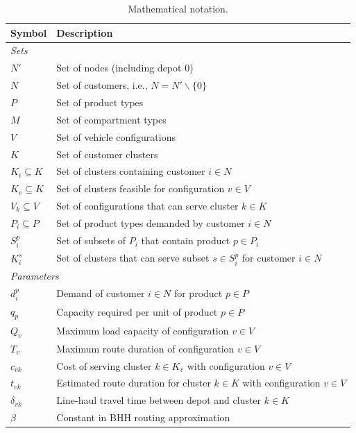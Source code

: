 \documentclass[11pt]{elsarticle}
\theoremstyle{plain}
\begin{document}
\begin{table}[htbp]
\centering
\caption{Mathematical notation.}
\label{tab:notation}
\begin{tabular}{ll}
    \toprule
    Symbol &  Description \\
    \midrule
    \multicolumn{2}{l}{\textit{Sets}} \\
    \midrule
    $N'$ & Set of nodes (including depot $0$) \\
    $N$ & Set of customers, i.e., $N = N' \backslash \{0\}$ \\
    $P$ & Set of product types \\
    $M$ & Set of compartment types \\
    $V$ & Set of vehicle configurations \\
    $K$ & Set of customer clusters \\
    $K_i \subseteq K$ & Set of clusters containing customer $i \in N$ \\
    $K_v \subseteq K$ & Set of clusters feasible for configuration $v \in V$ \\
    $V_k \subseteq V$ & Set of configurations that can serve cluster $k \in K$ \\
    $P_i \subseteq P$ & Set of product types demanded by customer $i \in N$ \\
    $S_i^p$ & Set of subsets of $P_i$ that contain product $p \in P_i$ \\
    $K_i^s$ & Set of clusters that can serve subset $s \in S_i^p$ for customer $i \in N$ \\
    \midrule
    \multicolumn{2}{l}{\textit{Parameters}} \\
    \midrule
    $d_i^p$ & Demand of customer $i \in N$ for product $p \in P$ \\
    $q_p$ & Capacity required per unit of product $p \in P$ \\
    $Q_v$ & Maximum load capacity of configuration $v \in V$ \\
    $T_v$ & Maximum route duration of configuration $v \in V$ \\
    $c_{vk}$ & Cost of serving cluster $k \in K_v$ with configuration $v \in V$ \\
    $t_{vk}$ & Estimated route duration for cluster $k \in K$ with configuration $v \in V$ \\
    $\delta_{vk}$ & Line-haul travel time between depot and cluster $k \in K$ \\
    $\beta$ & Constant in BHH routing approximation \\

\end{tabular}
\end{table}
\end{document}
